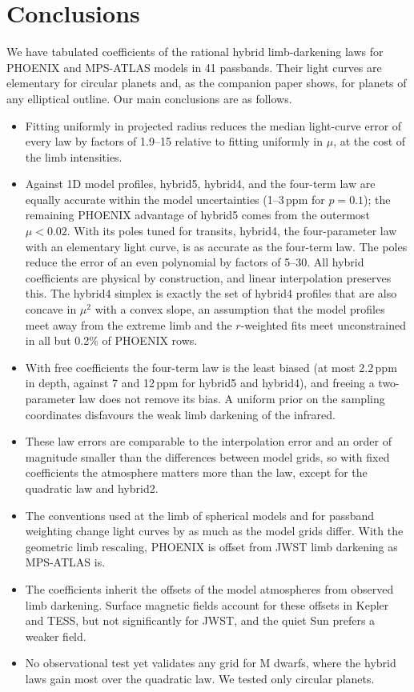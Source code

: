 \documentclass{aa}
\newcommand{\ppm}{\,\textrm{ppm}}
\begin{document}
\section{Conclusions}
We have tabulated coefficients of the rational hybrid limb-darkening laws for
PHOENIX and MPS-ATLAS models in 41 passbands. Their light curves are
elementary for circular planets and, as the companion paper shows, for planets
of any elliptical outline. Our main conclusions are as follows.
\begin{itemize}
\item Fitting uniformly in projected radius \citep{morello2020} reduces the
median light-curve error of every law by factors of 1.9--15 relative to
fitting uniformly in $\mu$, at the cost of the limb intensities.
\item Against 1D model profiles, hybrid5, hybrid4, and the four-term law are
equally accurate within the model uncertainties (1--3\ppm{} for $p=0.1$); the
remaining PHOENIX advantage of hybrid5 comes from the outermost $\mu<0.02$.
With its poles tuned for transits, hybrid4, the four-parameter law with an
elementary light curve, is as accurate as the four-term law. The poles reduce
the error of an even polynomial by factors of 5--30. All hybrid coefficients
are physical by construction, and linear interpolation preserves this. The
hybrid4 simplex is exactly the set of hybrid4 profiles that are also concave in
$\mu^2$ with a convex slope, an assumption that the model profiles meet away
from the extreme limb and the $r$-weighted fits meet unconstrained in all but
0.2\% of PHOENIX rows.
\item With free coefficients the four-term law is the least biased (at most
2.2\ppm{} in depth, against 7 and 12\ppm{} for hybrid5 and hybrid4), and
freeing a two-parameter law does not remove its bias. A uniform prior on the
sampling coordinates disfavours the weak limb darkening of the infrared.
\item These law errors are comparable to the interpolation error and an order
of magnitude smaller than the differences between model grids, so with fixed
coefficients the atmosphere matters more than the law, except for the
quadratic law and hybrid2.
\item The conventions used at the limb of spherical models and for passband
weighting change light curves by as much as the model grids differ. With the
geometric limb rescaling, PHOENIX is offset from JWST limb darkening as
MPS-ATLAS is.
\item The coefficients inherit the offsets of the model atmospheres from
observed limb darkening. Surface magnetic fields account for these offsets in
Kepler and TESS, but not significantly for JWST, and the quiet Sun prefers a
weaker field.
\item No observational test yet validates any grid for M dwarfs, where the
hybrid laws gain most over the quadratic law. We tested only circular
planets.
\end{itemize}
\end{document}
